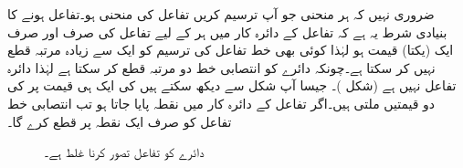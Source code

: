ضروری نہیں کہ ہر منحنی جو آپ ترسیم کریں تفاعل کی منحنی ہو۔تفاعل ہونے کا بنیادی شرط یہ ہے کہ تفاعل کے دائرہ کار میں ہر  کے لیے تفاعل کی صرف اور صرف ایک (یکتا) قیمت  ہو لہٰذا کوئی بھی  خط تفاعل کی ترسیم کو ایک سے زیادہ مرتبہ قطع نہیں کر سکتا ہے۔چونکہ دائرے کو انتصابی خط دو مرتبہ قطع کر سکتا ہے لہٰذا  دائرہ تفاعل نہیں ہے (شکل )۔ جیسا آپ شکل  سے دیکھ سکتے ہیں  کی ایک ہی قیمت پر  کی دو قیمتیں ملتی ہیں۔اگر تفاعل  کے دائرہ کار میں نقطہ  پایا جاتا ہو تب انتصابی خط  تفاعل کو صرف ایک نقطہ  پر قطع کرے گا۔
\begin{figure}
\centering
{}
\caption{دائرے کو تفاعل تصور کرنا غلط ہے۔}
\label{شکل_ابتدا_دائرہ_تفاعل_نہیں}
\end{figure}

